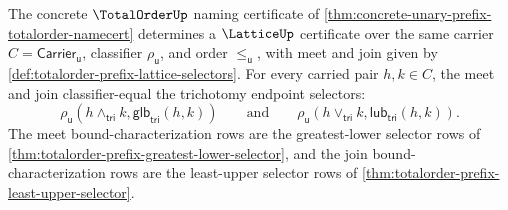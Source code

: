 \begin{theorem}
\label{thm:totalorder-prefix-forgets-lattice-certificate}
The concrete $\TotalOrderUp$ naming certificate of \autoref{thm:concrete-unary-prefix-totalorder-namecert} determines a $\LatticeUp$ certificate over the same carrier $C=\mathsf{Carrier}_{\mathsf{u}}$, classifier $\rho_{\mathsf{u}}$, and order $\le_{\mathsf{u}}$, with meet and join given by \autoref{def:totalorder-prefix-lattice-selectors}. For every carried pair $h,k\in C$, the meet and join classifier-equal the trichotomy endpoint selectors:
$$
\rho_{\mathsf{u}}(h\wedge_{\mathsf{tri}}k,\mathsf{glb}_{\mathsf{tri}}(h,k))
\qquad\text{and}\qquad
\rho_{\mathsf{u}}(h\vee_{\mathsf{tri}}k,\mathsf{lub}_{\mathsf{tri}}(h,k)).
$$
The meet bound-characterization rows are the greatest-lower selector rows of \autoref{thm:totalorder-prefix-greatest-lower-selector}, and the join bound-characterization rows are the least-upper selector rows of \autoref{thm:totalorder-prefix-least-upper-selector}.
\end{theorem}
